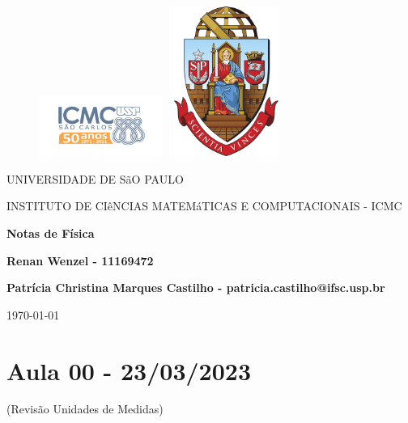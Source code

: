 \documentclass{article}
\begin{document}
\begin{figure}[ht]
	\includegraphics[width=4cm]{icmc.png}
	\hspace{7cm}
	\includegraphics[height=4.9cm,width=4cm]{brasao_usp_cor.jpg}
	\endminipage
\end{figure}

\begin{center}
	\vspace{1cm}
	\LARGE
	UNIVERSIDADE DE SãO PAULO

	\vspace{1.3cm}
	\LARGE
	INSTITUTO DE CIêNCIAS MATEMáTICAS E COMPUTACIONAIS - ICMC

	\vspace{1.7cm}
	\Large
	\textbf{Notas de Física}

	\vspace{1.3cm}
	\large
	\textbf{Renan Wenzel - 11169472}

	\vspace{1.3cm}
	\large
	\textbf{Patrícia Christina Marques Castilho - patricia.castilho@ifsc.usp.br}

	\vspace{1.3cm}
	\today
\end{center}

\newpage

\tableofcontents

\newpage

\section{Aula 00 - 23/03/2023}
 (Revisão Unidades de Medidas)


\newpage

\newpage

\newpage

\newpage

\newpage

\newpage

\newpage

\newpage

\newpage

\newpage

\newpage

\newpage

\newpage

\newpage

\newpage

\newpage

\newpage

\newpage

\newpage
\end{document}

